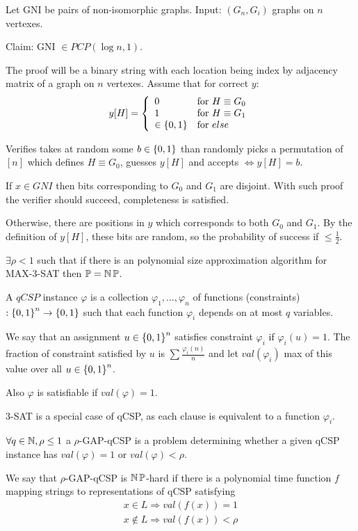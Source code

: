 \begin{example}
	Let GNI be pairs of non-isomorphic graphs.
	Input: $(G_n, G_i)$ graphs on $n$ vertexes.

	Claim: GNI $\in PCP (\log n, 1)$.

	The proof will be a binary string with each location being index by adjacency matrix of a graph on $n$ vertexes.
	Assume that for correct $y$:
	\[ y[H] = \left\{ \begin{array}{lll} 0 & \mbox{for } H \equiv G_0 \\ 1 & \mbox{for } H \equiv G_1 \\  \in \operatorname{\{ 0, 1 \}} & \mbox{for } else \end{array} \right. \]

	Verifies takes at random some $b \in \operatorname{\{ 0, 1 \}}$ than randomly picks a permutation of $[n]$ which defines $H \equiv G_0$, guesses $y[H]$ and accepts $\iff y[H] = b$.

	If $x \in GNI$ then bits corresponding to $G_0$ and $G_1$ are disjoint.
	With such proof the verifier should succeed, completeness is satisfied.

	Otherwise, there are positions in $y$ which corresponds to both $G_0$ and $G_1$.
	By the definition of $y[H]$, these bits are random, so the probability of success if $\leq \frac{1}{2}$.
\end{example}

\begin{corollary}
	$\exists \rho < 1$ such that if there is an polynomial size approximation algorithm for MAX-3-SAT then $\operatorname{\mathbb{P}} = \operatorname{\operatorname{\mathbb{N}}\mathbb{P}}$.
\end{corollary}

\begin{definition}[qCSP]
	A $qCSP$ instance $\varphi$ is a collection $\varphi_1, \ldots, \varphi_n$ of functions (constraints)$:\operatorname{\{ 0, 1 \}}^n \to \operatorname{\{ 0, 1 \}}$ such that each function $\varphi_i$ depends on at most $q$ variables.

	We say that an assignment $u \in \operatorname{\{ 0, 1 \}}^n$ satisfies constraint $\varphi_i$ if $\varphi_i(u) = 1$.
	The fraction of constraint satisfied by $u$ is $\sum \frac{\varphi_i(n)}{n}$ and let $val(\varphi_i)$ max of this value over all $u \in \operatorname{\{ 0, 1 \}}^n$.

	Also $\varphi$ is satisfiable if $val(\varphi) = 1$.

	3-SAT is a special case of qCSP, as each clause is equivalent to a function $\varphi_i$.
\end{definition}

\begin{definition}
	$\forall q \in \operatorname{\mathbb{N}}, \rho \leq 1$ a $\rho$-GAP-qCSP is a problem determining whether a given qCSP instance has $val(\varphi) = 1$ or $val(\varphi) < \rho$.

	We say that $\rho$-GAP-qCSP is $\operatorname{\operatorname{\mathbb{N}}\mathbb{P}}$-hard if there is a polynomial time function $f$ mapping strings to representations of qCSP satisfying
	\begin{gather*}
		x \in L \Rightarrow val(f(x)) = 1 \\
		x \notin L \Rightarrow val(f(x)) < \rho
	\end{gather*}
\end{definition}

